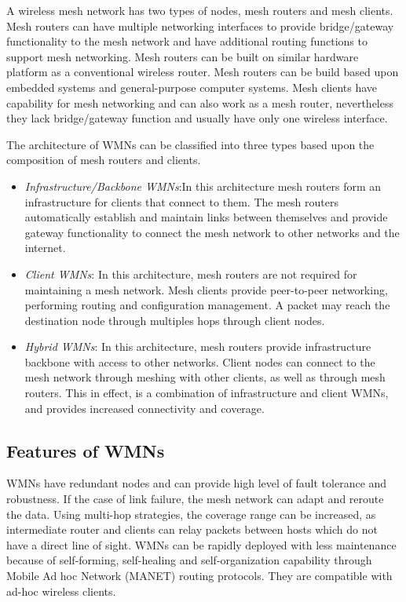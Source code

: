 A wireless mesh network has two types of nodes, mesh routers and mesh clients. Mesh routers can have multiple networking interfaces to provide bridge/gateway functionality to the mesh network and have additional routing functions to support mesh networking. Mesh routers can be built on similar hardware platform as a conventional wireless router. Mesh routers can be build based upon embedded systems and general-purpose computer systems. Mesh clients have capability for mesh networking and can also work as a mesh router, nevertheless they lack bridge/gateway function and usually have only one wireless interface.


The architecture of WMNs can be classified into three types based upon the composition of mesh routers and clients.

\begin{itemize}
	\item \textit{Infrastructure/Backbone WMNs}:In this architecture mesh routers form an infrastructure for clients that connect to them. The mesh routers automatically establish and maintain links between themselves and provide gateway functionality to connect the mesh network to other networks and the internet. 
	
	\item \textit{Client WMNs}: In this architecture, mesh routers are not required for maintaining a mesh network. Mesh clients provide peer-to-peer networking, performing routing and configuration management. A packet may reach the destination node through multiples hops through client nodes.
	  
	\item \textit{Hybrid WMNs}: In this architecture, mesh routers provide infrastructure backbone with access to other networks. Client nodes can connect to the mesh network through meshing with other clients, as well as through mesh routers. This in effect, is a combination of infrastructure and client WMNs, and provides increased connectivity and coverage.
\end{itemize}

\subsection{Features of WMNs}

WMNs have redundant nodes and can provide high level of fault tolerance and robustness. If the case of link failure, the mesh network can adapt and reroute the data. Using multi-hop strategies, the coverage range can be increased, as intermediate router and clients can relay packets between hosts which do not have a direct line of sight. WMNs can be rapidly deployed with less maintenance because of self-forming, self-healing and self-organization capability through Mobile Ad hoc Network (MANET) routing protocols. They are compatible with ad-hoc wireless clients.



